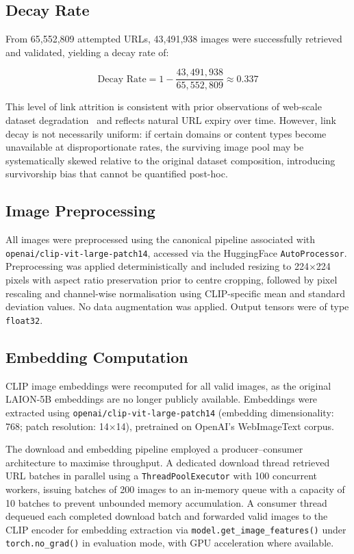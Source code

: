 \subsection{Decay Rate}

From 65,552,809 attempted URLs, 43,491,938 images were successfully
retrieved and validated, yielding a decay rate of:

\[
\text{Decay Rate} = 1 - \frac{43{,}491{,}938}{65{,}552{,}809} \approx 0.337
\]

This level of link attrition is consistent with prior observations of
web-scale dataset degradation~\cite{Klein_2014_LinkRot,
	Schuhmann_2022_Laion5b} and reflects natural URL expiry over time. However,
link decay is not necessarily uniform: if certain domains or content types
become unavailable at disproportionate rates, the surviving image pool may
be systematically skewed relative to the original dataset composition,
introducing survivorship bias that cannot be quantified post-hoc.

\subsection{Image Preprocessing}

All images were preprocessed using the canonical pipeline associated with
\texttt{openai/clip-vit-large-patch14}, accessed via the HuggingFace
\texttt{AutoProcessor}. Preprocessing was applied deterministically and
included resizing to 224$\times$224 pixels with aspect ratio preservation
prior to centre cropping, followed by pixel rescaling and channel-wise
normalisation using CLIP-specific mean and standard deviation values. No
data augmentation was applied. Output tensors were of type \texttt{float32}.

\subsection{Embedding Computation}
\label{subsec:embedding_computation}

CLIP image embeddings were recomputed for all valid images, as the original
LAION-5B embeddings are no longer publicly available. Embeddings were
extracted using \texttt{openai/clip-vit-large-patch14} (embedding
dimensionality: 768; patch resolution: 14$\times$14), pretrained on
OpenAI's WebImageText corpus.

The download and embedding pipeline employed a producer--consumer
architecture to maximise throughput. A dedicated download thread retrieved
URL batches in parallel using a \texttt{ThreadPoolExecutor} with 100
concurrent workers, issuing batches of 200 images to an in-memory queue
with a capacity of 10 batches to prevent unbounded memory accumulation. A
consumer thread dequeued each completed download batch and forwarded valid
images to the CLIP encoder for embedding extraction via
\texttt{model.get\_image\_features()} under \texttt{torch.no\_grad()} in
evaluation mode, with GPU acceleration where available.

